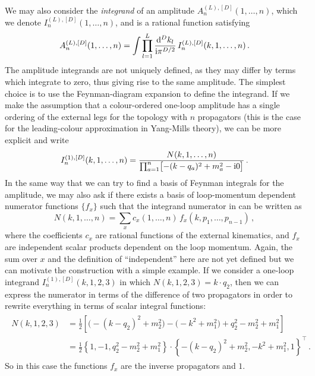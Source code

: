 We may also consider the \emph{integrand} of an amplitude $A_n^{(L),[D]}(1,\ldots,n)$, which we denote $I_n^{(L),[D]}(1,\ldots,n)$, and is a rational function satisfying
\begin{equation}
  A_n^{(L),[D]}(1,\ldots,n) = \int \prod_{l=1}^L \frac{\mathrm{d}^D k_l}{\mathrm{i}\pi^{D/2}} \, I_n^{(L),[D]}(k, 1,\ldots,n) \,.
\end{equation}
The amplitude integrands are not uniquely defined, as they may differ by terms which integrate to zero, thus giving rise to the same amplitude. The simplest choice is to use the Feynman-diagram expansion to define the integrand.
If we make the assumption that a colour-ordered one-loop amplitude has a single
ordering of the external legs for the topology with $n$ propagators (this is the case for the
leading-colour approximation in Yang-Mills theory), we can be more explicit and
write
\begin{equation} \label{eq:integrand_ordered_1L}
  I_n^{(1),[D]}(k,1,\ldots,n) = \frac{{N}(k,1,\ldots,n)}{\prod_{a=1}^{n}\bigl[-(k-q_a)^2+m_{a}^2-\mathrm{i}0\bigr]} \,.
\end{equation}
In the same way that we can try to find a basis of Feynman integrals for the
amplitude, we may also ask if there exists a basis of loop-momentum dependent
numerator functions $\{f_x\}$ such that the integrand numerator in  can be written as
\begin{equation}
  N(k,1,\ldots,n) = \sum_x c_x(1,\ldots,n) \,f_x(k,p_1,\ldots,p_{n-1}) \,,
\end{equation}
where the coefficients $c_x$ are rational functions of the external kinematics,
and $f_x$ are independent scalar products dependent on the loop momentum.
Again, the sum over $x$ and the definition of ``independent'' here are not yet
defined but we can motivate the construction with a simple example. If we
consider a one-loop integrand $I_n^{(1),[D]}(k,1,2,3)$ in which
${N}(k,1,2,3) = k\cdot q_{2}$, then we can express the numerator in terms of
the difference of two propagators in order to rewrite everything in terms of scalar integral
functions:
\begin{eqnarray}
  \begin{aligned}
  {N}(k,1,2,3)
  &= \frac{1}{2}\left[ \bigl(-(k-q_2)^2+m_2^2\bigr) - \bigl(-k^2+m_1^2\bigr) + q_2^2-m_2^2+m_1^2 \right] \\
  &= \frac{1}{2}\left\{1,-1,q_2^2-m_2^2+m_1^2\right\} \cdot \left\{-(k-q_2)^2+m_2^2, -k^2+m_1^2, 1\right\}^{\top} \,.
  \end{aligned}
\end{eqnarray}
So in this case the functions $f_x$ are the inverse propagators and $1$.


